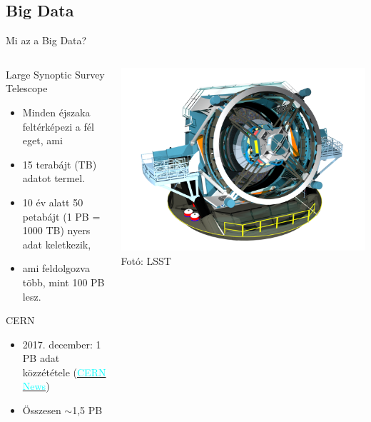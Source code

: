 \subsection{Big Data}
\begin{frame}{Mi az a Big Data?}
    \begin{columns}
        \begin{column}{0.5\textwidth}
            Large Synoptic Survey Telescope
            \begin{itemize}
                \item Minden éjszaka feltérképezi a fél eget, ami
                \item 15 terabájt (TB) adatot termel.
                \item 10 év alatt 50 petabájt (1 PB = 1000 TB) nyers adat keletkezik,
                \item ami feldolgozva több, mint 100 PB lesz.
            \end{itemize}
            
            CERN
            \begin{itemize}
                \item 2017. december: 1 PB adat közzététele (\href{https://home.cern/news/news/experiments/cms-releases-more-one-petabyte-open-data}{\textcolor{cyan}{CERN News}})
                \item Összesen $\sim$1,5 PB
            \end{itemize}
        \end{column}
        \begin{column}{0.5\textwidth}
            \centering
            \includegraphics[height=0.4\textheight]{figures/lsst.png} \\ %
            \tiny{Fotó: LSST}


\end{column}
\end{columns}
\end{frame}
